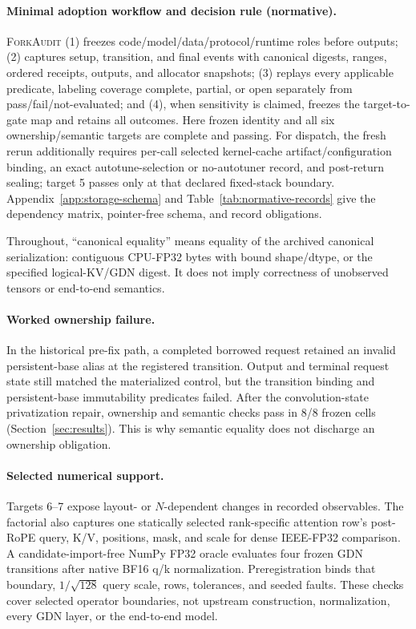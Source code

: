 \documentclass{article}
\newcommand{\method}{\textsc{ForkAudit}}
\begin{document}
\paragraph{Minimal adoption workflow and decision rule (normative).}
\method{} (1) freezes code/model/data/protocol/runtime roles before outputs;
(2) captures setup, transition, and final events with canonical digests,
ranges, ordered receipts, outputs, and allocator snapshots; (3) replays every
applicable predicate, labeling coverage complete, partial, or open separately
from pass/fail/not-evaluated; and (4), when sensitivity is claimed, freezes the
target-to-gate map and retains all outcomes.  Here frozen identity and all six
ownership/semantic targets are complete and passing.  For dispatch, the fresh
rerun additionally requires per-call selected kernel-cache
artifact/configuration binding, an exact autotune-selection or no-autotuner
record, and post-return sealing;
target 5 passes only at that declared fixed-stack boundary.
Appendix~\ref{app:storage-schema} and Table~\ref{tab:normative-records} give the
dependency matrix, pointer-free schema, and record obligations.

Throughout, ``canonical equality'' means equality of the archived canonical
serialization: contiguous CPU-FP32 bytes with bound shape/dtype, or the
specified logical-KV/GDN digest.  It does not imply correctness of unobserved
tensors or end-to-end semantics.

\paragraph{Worked ownership failure.}
In the historical pre-fix path, a completed borrowed request retained an
invalid persistent-base alias at the registered transition.  Output and
terminal request state still matched the materialized control, but the
transition binding and persistent-base immutability predicates failed.  After
the convolution-state privatization repair, ownership and semantic checks pass
in 8/8 frozen cells (Section~\ref{sec:results}).  This is why semantic equality
does not discharge an ownership obligation.

\paragraph{Selected numerical support.}
Targets 6--7 expose layout- or $N$-dependent changes in recorded observables.
The factorial also captures one statically selected rank-specific attention
row's post-RoPE query, K/V, positions, mask, and scale for dense IEEE-FP32
comparison.  A candidate-import-free NumPy FP32 oracle evaluates four frozen
GDN transitions after native BF16 q/k normalization.  Preregistration binds
that boundary, $1/\sqrt{128}$ query scale, rows, tolerances, and seeded faults.
These checks cover selected operator boundaries, not upstream construction,
normalization, every GDN layer, or the end-to-end model.
\end{document}
